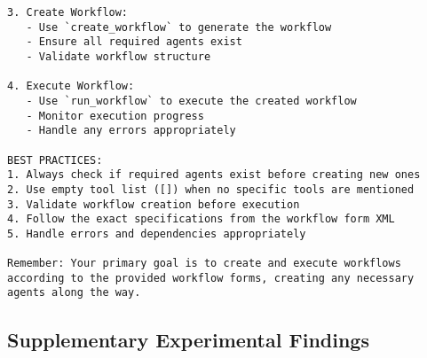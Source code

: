 \begin{lstlisting}
3. Create Workflow:
   - Use `create_workflow` to generate the workflow
   - Ensure all required agents exist
   - Validate workflow structure

4. Execute Workflow:
   - Use `run_workflow` to execute the created workflow
   - Monitor execution progress
   - Handle any errors appropriately

BEST PRACTICES:
1. Always check if required agents exist before creating new ones
2. Use empty tool list ([]) when no specific tools are mentioned
3. Validate workflow creation before execution
4. Follow the exact specifications from the workflow form XML
5. Handle errors and dependencies appropriately

Remember: Your primary goal is to create and execute workflows according to the provided workflow forms, creating any necessary agents along the way.
\end{lstlisting}


\subsection{Supplementary Experimental Findings}

